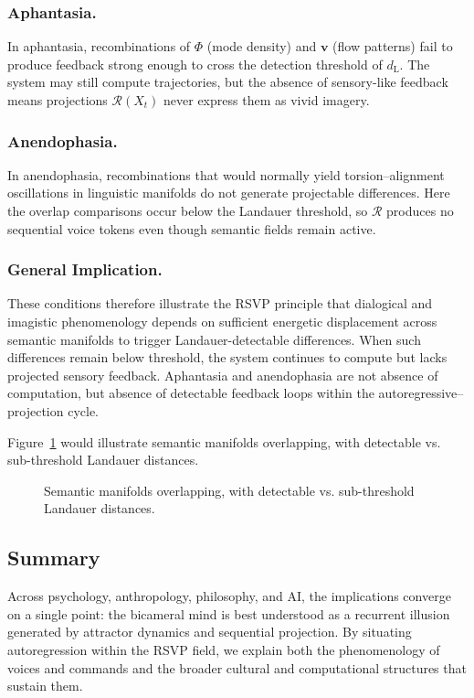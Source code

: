 \documentclass[a4paper,11pt]{article}
\begin{document}
\subsubsection{Aphantasia.}
In aphantasia, recombinations of $\Phi$ (mode density) and $\mathbf{v}$ (flow
patterns) fail to produce feedback strong enough to cross the detection
threshold of $d_{\mathrm{L}}$. The system may still compute trajectories, but
the absence of sensory-like feedback means projections $\mathcal{R}(X_t)$ never
express them as vivid imagery.

\subsubsection{Anendophasia.}
In anendophasia, recombinations that would normally yield torsion--alignment
oscillations in linguistic manifolds do not generate projectable differences.
Here the overlap comparisons occur below the Landauer threshold, so $\mathcal{R}$
produces no sequential voice tokens even though semantic fields remain
active.

\subsubsection{General Implication.}
These conditions therefore illustrate the RSVP principle that dialogical and
imagistic phenomenology depends on sufficient energetic displacement across
semantic manifolds to trigger Landauer-detectable differences. When such
differences remain below threshold, the system continues to compute but lacks
projected sensory feedback. Aphantasia and anendophasia are not absence of
computation, but absence of detectable feedback loops within the
autoregressive--projection cycle.

Figure~\ref{fig:manifolds} would illustrate semantic manifolds overlapping, with detectable vs. sub-threshold Landauer distances.

\begin{figure}[h]
\centering
\caption{Semantic manifolds overlapping, with detectable vs. sub-threshold Landauer distances.}
\label{fig:manifolds}
\end{figure}

\subsection{Summary}
Across psychology, anthropology, philosophy, and AI, the implications converge
on a single point: the bicameral mind is best understood as a recurrent illusion
generated by attractor dynamics and sequential projection. By situating
autoregression within the RSVP field, we explain both the phenomenology of
voices and commands and the broader cultural and computational structures that
sustain them.
\end{document}
